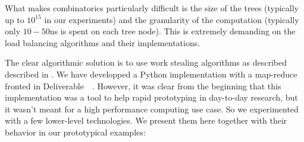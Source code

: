 \documentclass{deliverablereport}
\begin{document}
What makes combinatorics particularly difficult is the size of the
trees (typically up to $10^{15}$ in our experiments) and the granularity of the
computation (typically only $10-50$ns is spent on each tree node). This is
extremely demanding on the load balancing algorithms and their implementations.

The clear algorithmic solution is to use work stealing algorithms as described
described in \cite{10.1109/SFCS.1994.365680, BlumofeL99}. We have developped a 
Python implementation with a map-reduce fronted
in Deliverable~~\cite{map-reduce}. However, it
was clear from the beginning that this 
implementation was a tool to help rapid prototyping in day-to-day research,
but it wasn't meant for a high performance computing use case. So we experimented
with a few lower-level technologies. We present them here together with their
behavior in our prototypical examples:
\end{document}
